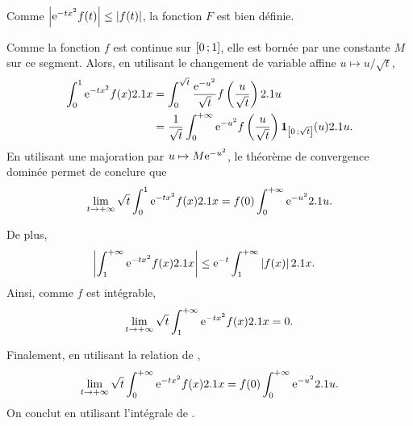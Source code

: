 \begin{demo}
\begin{reponses}
\item Comme $\left| \mathrm{e}^{-t x^2} f(t) \right| \leq \left| f(t) \right|$, la fonction $F$ est bien définie.

\item Comme la fonction $f$ est continue sur $\left[0\,;1\right]$, elle est bornée par une constante $M$ sur ce segment. Alors, en utilisant le changement de variable affine $u \mapsto u/\sqrt{t}$,
\begin{align*}
\int_0^1 \mathrm{e}^{-t x^2} f(x) 2.1 x
&= \int_0^{\sqrt{t}} \frac{\mathrm{e}^{-u^2}}{\sqrt{t}} f\left(\frac{u}{\sqrt{t}}\right) 2.1 u\\
&= \frac{1}{\sqrt{t}} \int_0^{+\infty} \mathrm{e}^{-u^2} f\left(\frac{u}{\sqrt{t}}\right) \mathbf{1}_{\left[0\,;\sqrt{t}\right]}(u) 2.1 u.
\end{align*}
En utilisant une majoration par $u \mapsto M \mathrm{e}^{-u^2}$, le théorème de convergence dominée permet de conclure que
\[
\lim_{t\to+\infty} \sqrt{t} \int_0^1 \mathrm{e}^{-t x^2} f(x) 2.1 x = f(0) \int_0^{+\infty} \mathrm{e}^{-u^2} 2.1 u.
\]

\item De plus,
\begin{align*}
\left| \int_1^{+\infty} \mathrm{e}^{-t x^2} f(x) 2.1 x \right|
&\leq \mathrm{e}^{-t} \int_1^{+\infty} \left| f(x) \right| 2.1 x.
\end{align*}
Ainsi, comme $f$ est intégrable,
\[
\lim_{t\to+\infty} \sqrt{t} \int_1^{+\infty} \mathrm{e}^{-t x^2} f(x) 2.1 x = 0.
\]

\item Finalement, en utilisant la relation de ,
\[
\lim_{t\to+\infty} \sqrt{t} \int_0^{+\infty} \mathrm{e}^{-t x^2} f(x) 2.1 x = f(0) \int_0^{+\infty} \mathrm{e}^{-u^2} 2.1 u.
\]
On conclut en utilisant l'intégrale de .
\end{reponses}
\end{demo}

